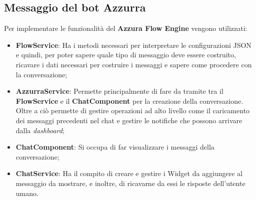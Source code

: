 \subsection{Messaggio del bot Azzurra}
Per implementare le funzionalità del \textbf{Azzura Flow Engine} vengono utilizzati:
\begin{itemize}
	\item \textbf{FlowService}: Ha i metodi necessari per interpretare le configurazioni JSON e quindi, per poter sapere quale tipo di messaggio deve essere costruito, ricavare i dati necessari per costruire i messaggi e sapere come procedere con la conversazione;
	\item \textbf{AzzurraService}: Permette principalmente di fare da tramite tra il \textbf{FlowService} e il \textbf{ChatComponent} per la creazione della conversazione. Oltre a ciò permette di gestire operazioni ad alto livello come il caricamento dei messaggi precedenti nel chat e gestire le notifiche che possono arrivare dalla \emph{dashboard};
	\item \textbf{ChatComponent}: Si occupa di far visualizzare i messaggi della conversazione;
	\item \textbf{ChatService}: Ha il compito di creare e gestire i Widget da aggiungere al messaggio da mostrare, e inoltre, di ricavarne da essi le risposte dell'utente umano.
\end{itemize}

